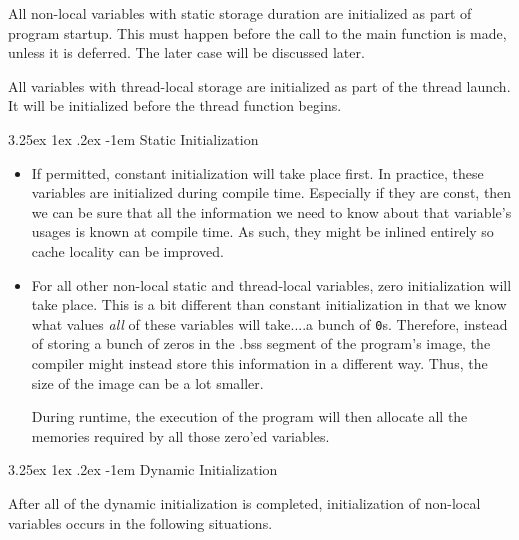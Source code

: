\documentclass[a4paper, 12pt]{extbook}
\makeatletter
\renewcommand\paragraph{\@startsection{paragraph}{5}{\z@}%
  {3.25ex \@plus1ex \@minus.2ex}%
  {-1em}%
  {\normalfont\normalsize\bfseries}}
\makeatother
\begin{document}
All non-local variables with static storage duration are initialized as part of program startup.
This must happen before the call to the main function is made, unless it is deferred.
The later case will be discussed later.

All variables with thread-local storage are initialized as part of the thread launch.
It will be initialized before the thread function begins.

\paragraph{Static Initialization}

\begin{itemize}
  \item
        If permitted, constant initialization will take place first.
        In practice, these variables are initialized during compile time.
        Especially if they are const, then we can be sure that all the information we need to know about that variable's usages is known at compile time.
        As such, they might be inlined entirely so cache locality can be improved.
  \item
        For all other non-local static and thread-local variables, zero initialization will take place.
        This is a bit different than constant initialization in that we know what values \textit{all} of these variables will take....a bunch of \verb|0|s.
        Therefore, instead of storing a bunch of zeros in the .bss segment of the program's image, the compiler might instead store this information in a different way.
        Thus, the size of the image can be a lot smaller.

        During runtime, the execution of the program will then allocate all the memories required by all those zero'ed variables.
\end{itemize}

\paragraph{Dynamic Initialization}


After all of the dynamic initialization is completed, initialization of non-local variables occurs in the following situations.
\end{document}
